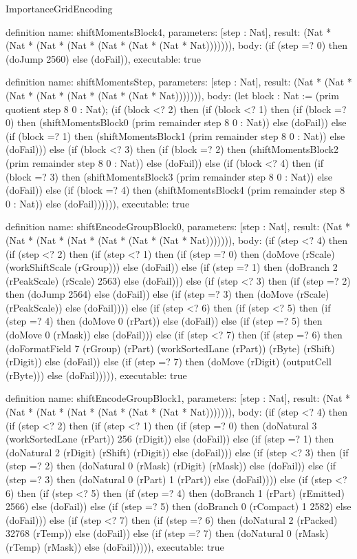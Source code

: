 \begin{lexlean}{ImportanceGridEncoding}
\begin{semanticmodule}
definition{
  name: shiftMomentsBlock4,
  parameters: [step : Nat],
  result: (Nat * (Nat * (Nat * (Nat * (Nat * (Nat * (Nat * Nat))))))),
  body: (if (step =? 0) then (doJump 2560) else (doFail)),
  executable: true
}

definition{
  name: shiftMomentsStep,
  parameters: [step : Nat],
  result: (Nat * (Nat * (Nat * (Nat * (Nat * (Nat * (Nat * Nat))))))),
  body: (let block : Nat := (prim quotient step 8 0 : Nat); (if (block <? 2) then
      (if (block <? 1) then
      (if (block =? 0) then (shiftMomentsBlock0 (prim remainder step 8 0 : Nat)) else (doFail)) else
      (if (block =? 1) then (shiftMomentsBlock1 (prim remainder step 8 0 : Nat)) else (doFail))) else
      (if (block <? 3) then
      (if (block =? 2) then (shiftMomentsBlock2 (prim remainder step 8 0 : Nat)) else (doFail)) else
      (if (block <? 4) then
      (if (block =? 3) then (shiftMomentsBlock3 (prim remainder step 8 0 : Nat)) else (doFail)) else
      (if (block =? 4) then (shiftMomentsBlock4 (prim remainder step 8 0 : Nat)) else (doFail)))))),
  executable: true
}

definition{
  name: shiftEncodeGroupBlock0,
  parameters: [step : Nat],
  result: (Nat * (Nat * (Nat * (Nat * (Nat * (Nat * (Nat * Nat))))))),
  body: (if (step <? 4) then
      (if (step <? 2) then
      (if (step <? 1) then
      (if (step =? 0) then (doMove (rScale) (workShiftScale (rGroup))) else (doFail)) else
      (if (step =? 1) then (doBranch 2 (rPeakScale) (rScale) 2563) else (doFail))) else
      (if (step <? 3) then
      (if (step =? 2) then (doJump 2564) else (doFail)) else
      (if (step =? 3) then (doMove (rScale) (rPeakScale)) else (doFail)))) else
      (if (step <? 6) then
      (if (step <? 5) then
      (if (step =? 4) then (doMove 0 (rPart)) else (doFail)) else
      (if (step =? 5) then (doMove 0 (rMask)) else (doFail))) else
      (if (step <? 7) then
      (if (step =? 6) then (doFormatField 7 (rGroup) (rPart) (workSortedLane (rPart)) (rByte) (rShift) (rDigit)) else (doFail)) else
      (if (step =? 7) then (doMove (rDigit) (outputCell (rByte))) else (doFail))))),
  executable: true
}

definition{
  name: shiftEncodeGroupBlock1,
  parameters: [step : Nat],
  result: (Nat * (Nat * (Nat * (Nat * (Nat * (Nat * (Nat * Nat))))))),
  body: (if (step <? 4) then
      (if (step <? 2) then
      (if (step <? 1) then
      (if (step =? 0) then (doNatural 3 (workSortedLane (rPart)) 256 (rDigit)) else (doFail)) else
      (if (step =? 1) then (doNatural 2 (rDigit) (rShift) (rDigit)) else (doFail))) else
      (if (step <? 3) then
      (if (step =? 2) then (doNatural 0 (rMask) (rDigit) (rMask)) else (doFail)) else
      (if (step =? 3) then (doNatural 0 (rPart) 1 (rPart)) else (doFail)))) else
      (if (step <? 6) then
      (if (step <? 5) then
      (if (step =? 4) then (doBranch 1 (rPart) (rEmitted) 2566) else (doFail)) else
      (if (step =? 5) then (doBranch 0 (rCompact) 1 2582) else (doFail))) else
      (if (step <? 7) then
      (if (step =? 6) then (doNatural 2 (rPacked) 32768 (rTemp)) else (doFail)) else
      (if (step =? 7) then (doNatural 0 (rMask) (rTemp) (rMask)) else (doFail))))),
  executable: true
}


\end{semanticmodule}
\end{lexlean}
